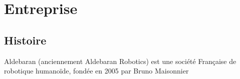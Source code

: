 \chapter*{Entreprise}
\label{Entreprise}
\thispagestyle{fancy}

\section{Histoire}
Aldebaran (anciennement Aldebaran Robotics) est une société Française de robotique humanoïde, fondée en 2005 par Bruno Maisonnier